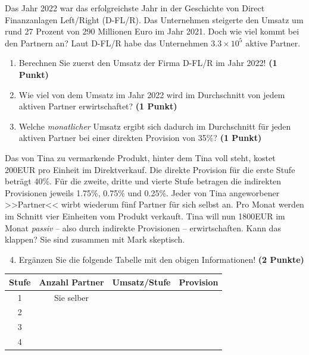 \documentclass[a4paper, 9pt]{scrartcl}\usepackage[]{graphicx}\usepackage[]{xcolor}
\begin{document}
Das Jahr 2022 war das erfolgreichste Jahr in der Geschichte von Direct Finanzanlagen Left/Right (D-FL/R). Das Unternehmen steigerte den Umsatz um rund 27 Prozent von 290 Millionen Euro im Jahr 2021. Doch wie viel kommt bei den Partnern an? Laut D-FL/R habe das Unternehmen \ensuremath{3.3\times 10^{5}} aktive Partner.

\begin{enumerate}
\item Berechnen Sie zuerst den Umsatz der Firma D-FL/R im Jahr 2022! \textbf{(1 Punkt)}
\item Wie viel von dem Umsatz im Jahr 2022 wird im Durchschnitt von jedem aktiven Partner erwirtschaftet? \textbf{(1 Punkt)}
\item Welche \textit{monatlicher} Umsatz ergibt sich dadurch im Durchschnitt für jeden aktiven Partner bei einer direkten Provision von 35\%? \textbf{(1 Punkt)}
\end{enumerate}

Das von Tina zu vermarkende Produkt, hinter dem Tina voll steht, kostet 200EUR pro Einheit im Direktverkauf. Die direkte Provision für die erste Stufe beträgt 40\%. Für die zweite, dritte und vierte Stufe betragen die indirekten Provisionen jeweils 1.75\%, 0.75\% und 0.25\%. Jeder von Tina angeworbener >>Partner<< wirbt wiederum fünf Partner für sich selbst an. Pro Monat werden im Schnitt vier Einheiten vom Produkt verkauft. Tina will nun 1800EUR im Monat \textit{passiv} -- also durch indirekte Provisionen -- erwirtschaften. Kann das klappen? Sie sind zusammen mit Mark skeptisch.

\begin{enumerate}
  \setcounter{enumi}{3}
\item Ergänzen Sie die folgende Tabelle mit den obigen Informationen! \textbf{(2 Punkte)}
\end{enumerate}

\begin{center}
\begin{tabular}{c|c|c|c}
  \toprule
  \textbf{Stufe} & \textbf{Anzahl Partner}  & \textbf{Umsatz/Stufe} & \textbf{Provision}\\
  \midrule
  1 & Sie selber  &  & \\ \midrule
  2 &   &  &  \\ \midrule
  3 &   &  &  \\ \midrule
  4 &   &  &  \\
  \bottomrule
\end{tabular}
\end{center}
\end{document}
